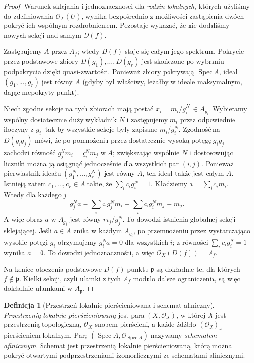 \documentclass[11pt,a4paper,openany]{report}
\numberwithin{equation}{section}
\theoremstyle{plain}
\theoremstyle{definition}
\newtheorem{definicja}[twierdzenie]{Definicja}
\theoremstyle{remark}
\newcommand{\Spec}{\operatorname{Spec}}
\begin{document}
\begin{proof}
Warunek sklejania i jednoznaczności dla \emph{rodzin
lokalnych}, których użyliśmy do zdefiniowania
$\mathcal O_X(U)$, wynika bezpośrednio z możliwości
zastąpienia dwóch pokryć ich wspólnym rozdrobnieniem.
Pozostaje wykazać, że nie dodaliśmy nowych sekcji
nad samym $D(f)$.

Zastępujemy $A$ przez $A_f$; wtedy $D(f)$ staje się
całym jego spektrum. Pokrycie przez podstawowe zbiory
$D(g_1),\ldots,D(g_r)$ jest skończone po wybraniu
podpokrycia dzięki quasi-zwartości. Ponieważ zbiory
pokrywają $\Spec A$, ideał $(g_1,\ldots,g_r)$
jest równy $A$ (gdyby był właściwy, leżałby w ideale
maksymalnym, dając niepokryty punkt).

Niech zgodne sekcje na tych zbiorach mają postać
$x_i=m_i/g_i^{N_i}\in A_{g_i}$.
Wybieramy wspólny dostatecznie duży wykładnik $N$
i zastępujemy $m_i$ przez odpowiednie iloczyny
z $g_i$, tak by wszystkie sekcje były zapisane
$m_i/g_i^N$. Zgodność na $D(g_ig_j)$ mówi,
że po pomnożeniu przez dostatecznie wysoką
potęgę $g_ig_j$ zachodzi równość
$g_j^N m_i=g_i^N m_j$ w $A$; zwiększając wspólnie
$N$ i dostosowując liczniki można ją osiągnąć
jednocześnie dla wszystkich par $(i,j)$.
Ponieważ pierwiastnik ideału $(g_1^N,\ldots,g_r^N)$
jest równy $A$, ten ideał także jest całym $A$.
Istnieją zatem $c_1,\ldots,c_r\in A$ takie,
że $\sum_i c_i g_i^N=1$. Kładziemy
$a=\sum_i c_i m_i$. Wtedy dla każdego $j$
\[
 g_j^N a=\sum_i c_i g_j^N m_i
 =\sum_i c_i g_i^N m_j=m_j.
\]
A więc obraz $a$ w $A_{g_j}$ jest równy
$m_j/g_j^N$. To dowodzi istnienia globalnej sekcji
sklejającej. Jeśli $a\in A$ znika w każdym $A_{g_i}$,
po przemnożeniu przez wystarczająco wysokie potęgi
$g_i$ otrzymujemy $g_i^N a=0$ dla wszystkich $i$;
z równości $\sum_i c_i g_i^N=1$ wynika $a=0$.
To dowodzi jednoznaczności, a więc
$\mathcal O_X(D(f))=A_f$.

Na koniec otoczenia podstawowe $D(f)$ punktu
$\mathfrak p$ są dokładnie te, dla których
$f\notin\mathfrak p$. Kiełki sekcji, czyli
ułamki z tych $A_f$ modulo dalsze ograniczenia,
są więc dokładnie ułamkami w $A_{\mathfrak p}$.
\end{proof}

\begin{definicja}[Przestrzeń lokalnie pierścieniowana i schemat afiniczny]
\emph{Przestrzenią lokalnie pierścieniowaną} jest para
$(X,\mathcal O_X)$, w której $X$ jest przestrzenią
topologiczną, $\mathcal O_X$ snopem pierścieni,
a każde źdźbło $(\mathcal O_X)_x$ pierścieniem lokalnym.
Parę $(\Spec A,\mathcal O_{\Spec A})$ nazywamy
\emph{schematem afinicznym}. Schemat jest przestrzenią
lokalnie pierścieniowaną, którą można pokryć otwartymi
podprzestrzeniami izomorficznymi ze schematami afinicznymi.
\end{definicja}
\end{document}
